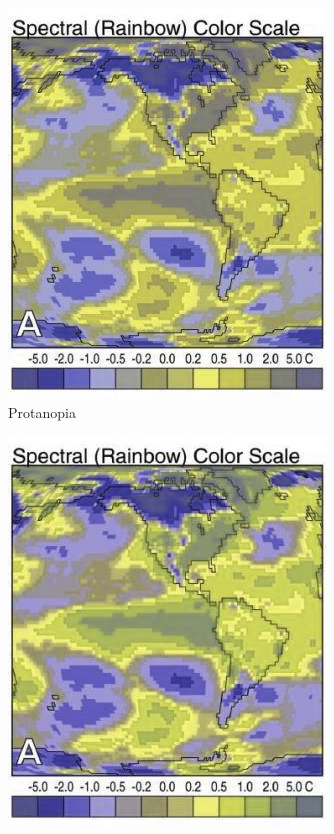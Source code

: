 \documentclass[11pt]{isuthesis}\usepackage[]{graphicx}\usepackage[]{color}
\begin{document}
\begin{figure}[!htbp]
\begin{minipage}[c]{.75\textwidth}
\begin{subfigure}[b]{.32\textwidth}
  \includegraphics[width=\textwidth]{RainbowScaleOrig-protanopia}
  \caption{Protanopia}
\end{subfigure}
\hfil\begin{subfigure}[b]{.32\textwidth}\centering
  \includegraphics[width=\textwidth]{RainbowScaleOrig-deuteranopia}

\end{subfigure}
\end{minipage}
\end{figure}
\end{document}
